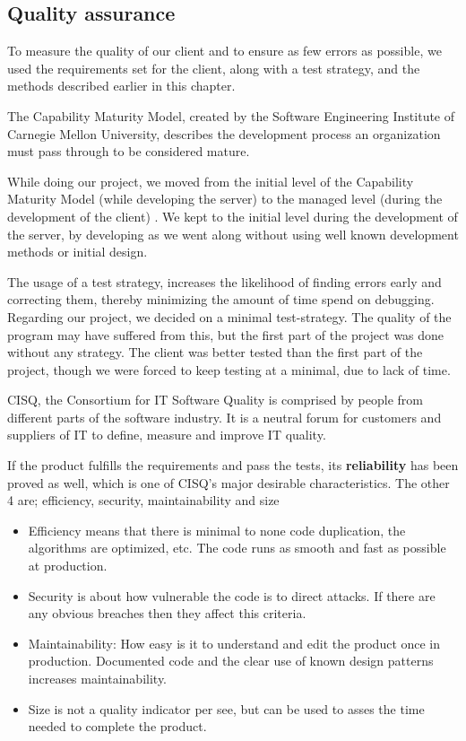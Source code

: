 \subsection{Quality assurance}
To measure the quality of our client and to ensure as few errors as possible, we used the requirements set for the client, along with a test strategy, and the methods described earlier in this chapter.

 The Capability Maturity Model, created by the Software Engineering Institute of Carnegie Mellon University, describes the development process an organization must pass through to be considered mature.

While doing our project, we moved from the initial level of the Capability Maturity Model (while developing the server) to the managed level (during the development of the client) \cite[p. 242]{PM}. We kept to the initial level during the development of the server, by developing as we went along without using well known development methods or initial design.

The usage of a test strategy, increases the likelihood of finding errors early and correcting them, thereby minimizing the amount of time spend on debugging.
Regarding our project, we decided on a minimal test-strategy. The quality of the program may have suffered from this, but the first part of the project was done without any strategy. The client was better tested than the first part of the project, though we were forced to keep testing at a minimal, due to lack of time.

CISQ, the Consortium for IT Software Quality is comprised by people from different parts of the software industry. It is a neutral forum for customers and suppliers of IT to define, measure and improve IT quality.

If the product fulfills the requirements and pass the tests, its \textbf{reliability} has been proved as well, which is one of CISQ's  major desirable characteristics. The other 4 are; efficiency, security, maintainability and size \cite{CISQ}

\begin{itemize}
	\item Efficiency means that there is minimal to none code duplication, the algorithms are optimized, etc. The code runs as smooth and fast as possible at production.
	\item Security is about how vulnerable the code is to direct attacks. If there are any obvious breaches then they affect this criteria.
	\item Maintainability: How easy is it to understand and edit the product once in production. Documented code and the clear use of known design patterns increases maintainability. 
	\item Size is not a quality indicator per see, but can be used to asses the time needed to complete the product.
\end{itemize}

